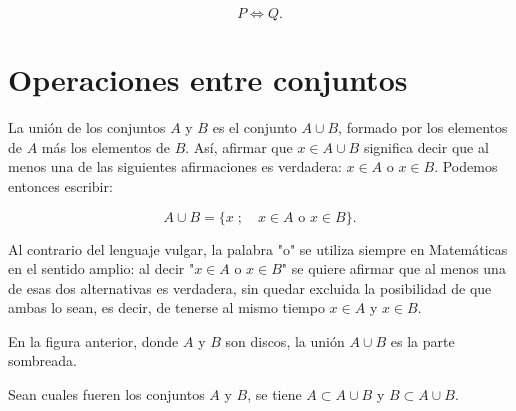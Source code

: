 \[
P \Leftrightarrow Q.
\]

\section{Operaciones entre conjuntos}

La unión de los conjuntos \(A\) y \(B\) es el conjunto \(A \cup B\), formado por los elementos de \(A\) más los elementos de \(B\). Así, afirmar que \(x \in A \cup B\) significa decir que al menos una de las siguientes afirmaciones es verdadera: \(x \in A\) o \(x \in B\). Podemos entonces escribir:

\[
A \cup B = \{x \; ; \quad x \in A \text{ o } x \in B\}.
\]

Al contrario del lenguaje vulgar, la palabra "o" se utiliza siempre en Matemáticas en el sentido amplio: al decir "\(x \in A\) o \(x \in B\)" se quiere afirmar que al menos una de esas dos alternativas es verdadera, sin quedar excluida la posibilidad de que ambas lo sean, es decir, de tenerse al mismo tiempo \(x \in A\) y \(x \in B\).

\begin{center}
\end{center}

En la figura anterior, donde \(A\) y \(B\) son discos, la unión \(A \cup B\) es la parte sombreada.

Sean cuales fueren los conjuntos \(A\) y \(B\), se tiene \(A \subset A \cup B\) y \(B \subset A \cup B\).

